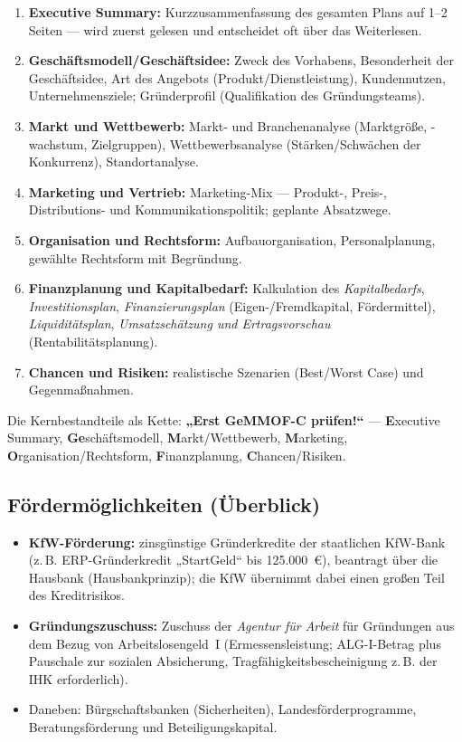 \documentclass[11pt, a4paper]{article}
\begin{document}
\begin{enumerate}
  \item \textbf{Executive Summary:} Kurzzusammenfassung des gesamten Plans auf 1--2
    Seiten --- wird zuerst gelesen und entscheidet oft über das Weiterlesen.
  \item \textbf{Geschäftsmodell/Geschäftsidee:} Zweck des Vorhabens, Besonderheit der
    Geschäftsidee, Art des Angebots (Produkt/Dienstleistung), Kundennutzen,
    Unternehmensziele; Gründerprofil (Qualifikation des Gründungsteams).
  \item \textbf{Markt und Wettbewerb:} Markt- und Branchenanalyse (Marktgröße, -wachstum,
    Zielgruppen), Wettbewerbsanalyse (Stärken/Schwächen der Konkurrenz), Standortanalyse.
  \item \textbf{Marketing und Vertrieb:} Marketing-Mix --- Produkt-, Preis-,
    Distributions- und Kommunikationspolitik; geplante Absatzwege.
  \item \textbf{Organisation und Rechtsform:} Aufbauorganisation, Personalplanung,
    gewählte Rechtsform mit Begründung.
  \item \textbf{Finanzplanung und Kapitalbedarf:} Kalkulation des \emph{Kapitalbedarfs},
    \emph{Investitionsplan}, \emph{Finanzierungsplan} (Eigen-/Fremdkapital, Fördermittel),
    \emph{Liquiditätsplan}, \emph{Umsatzschätzung und Ertragsvorschau}
    (Rentabilitätsplanung).
  \item \textbf{Chancen und Risiken:} realistische Szenarien (Best/Worst Case) und
    Gegenmaßnahmen.
\end{enumerate}

\begin{eselsbruecke}
Die Kernbestandteile als Kette: \textbf{„Erst GeMMOF-C prüfen!``} ---
\textbf{E}xecutive Summary, \textbf{Ge}schäftsmodell, \textbf{M}arkt/Wettbewerb,
\textbf{M}arketing, \textbf{O}rganisation/Rechtsform, \textbf{F}inanzplanung,
\textbf{C}hancen/Risiken.
\end{eselsbruecke}

\subsection{Fördermöglichkeiten (Überblick)}

\begin{itemize}
  \item \textbf{KfW-Förderung:} zinsgünstige Gründerkredite der staatlichen KfW-Bank
    (z.\,B. ERP-Gründerkredit „StartGeld`` bis 125.000~€), beantragt über die Hausbank
    (Hausbankprinzip); die KfW übernimmt dabei einen großen Teil des Kreditrisikos.
  \item \textbf{Gründungszuschuss:} Zuschuss der \emph{Agentur für Arbeit} für Gründungen
    aus dem Bezug von Arbeitslosengeld~I (Ermessensleistung; ALG-I-Betrag plus Pauschale
    zur sozialen Absicherung, Tragfähigkeitsbescheinigung z.\,B. der IHK erforderlich).
  \item Daneben: Bürgschaftsbanken (Sicherheiten), Landesförderprogramme,
    Beratungsförderung und Beteiligungskapital.
\end{itemize}
\end{document}
